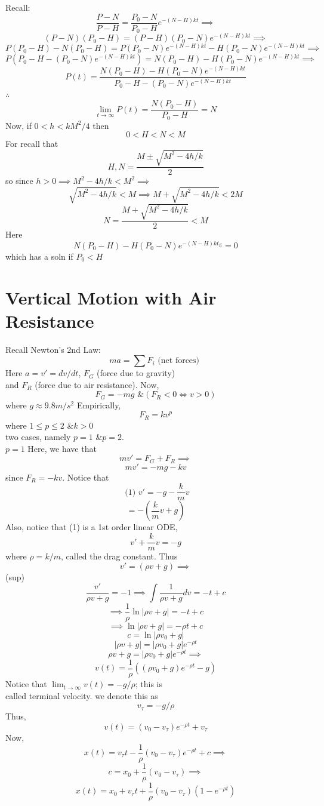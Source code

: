 \documentclass[10pt,a4paper]{article}
\theoremstyle{definition}
\begin{document}
  \newpage
  Recall: 
  \[ \frac{P-N}{P-H} =  \frac{P_0-N}{P_0-H} e^{-(N-H)kt} \implies \]
  \[ (P-N)(P_0-H) = (P-H)(P_0-N)e^{-(N-H)kt} \implies \]
  \[ P(P_0-H)-N(P_0-H) = P(P_0-N)e^{-(N-H)kt} - H(P_0-N)e^{-(N-H)kt}
  \implies \]
  \[ P(P_0-H-(P_0-N)e^{-(N-H)kt} ) = N(P_0-H) -H(P_0-N)e^{-(N-H)kt}
  \implies \]
  \[ \boxed{P(t) = \frac{N(P_0-H) -H(P_0-N)e^{-(N-H)kt}}{P_0-H-(P_0-N)e^{-(N-H)kt} }} \]
  \( \therefore \)
  \[ \lim_{t \to \infty} P(t) = \frac{N(P_0-H)}{P_0-H} = N \]
  Now, if \( 0<h<kM^2/4 \) then
  \[ 0<H<N<M \]
  For recall that
  \[ H,N = \frac{M \pm \sqrt{M^2-4h/k}}{2} \]
  so since \( h>0 \implies M^2-4h/k < M^2 \implies  \)
  \[ \sqrt{M^2-4h/k} < M \implies M + \sqrt{M^2-4h/k} < 2M \]
  \[ N = \frac{M + \sqrt{M^2-4h/k}}{2} < M \]
  Here 
  \[ N(P_0-H) -H(P_0-N)e^{-(N-H)kt_E} = 0 \]
  which has a soln if \( P_0 < H \)


  \newpage
\section*{Vertical Motion with Air Resistance}
  Recall Newton's 2nd Law:
  \[ ma = \sum F_i \text{ (net forces) } \]
  Here \( a = v' = dv/dt \), \( F_G \) (force due to gravity) \\
  and \( F_R \) (force due to air resistance). Now, 
  \[ F_G = -mg \text{ \& } (F_R < 0 \iff v>0) \]
  where \( g \approx 9.8m/s^2 \) Empirically, 
  \[ F_R = kv^p  \]
  where \( 1 \leq p \leq 2 \text{ \& } k>0 \) \\
  two cases, namely \( p=1 \text{ \& } p=2 \). \\[5mm]
  \( p=1 \) Here, we have that 
  \[ mv' = F_G + F_R \implies \]
  \[ mv' = -mg-kv \]
  since \( F_R = -kv \). Notice that 
  \[ \text{ (1) } v' = -g- \frac{k}{m}v \]
  \[ = -( \frac{k}{m}v +g) \]
  Also, notice that (1) is a 1st order linear ODE, 
  \[ v' + \frac{k}{m}v = -g \]
  where \( \rho = k/m \), called the drag constant. Thus 
  \[ v'= (\rho v + g) \implies \]
  (sup)
  \[ \frac{v'}{\rho v + g} = -1 \implies \int \frac{1}{\rho v +g} dv = -t
  +c \]
  \[ \implies \frac{1}{\rho} \ln |\rho v +g | = - t + c \]
  \[ \implies  \ln |\rho v +g | = -\rho t + c \]
  \[ c = \ln | \rho v_0 + g| \]
  \[ |\rho v +g | = | \rho v_0 + g| e^{-\rho t } \]
  \[ \rho v + g = | \rho v_0 + g| e^{-\rho t }  \implies\]
  \[ \boxed{ v(t) = \frac{1}{\rho} ((\rho v_0 + g )e^{-\rho t} -g )} \]
  Notice that \( \lim_{t \to \infty} v(t) = -g/\rho \); this is \\
  called terminal velocity. we denote this as 
  \[ v_{\tau} = -g/\rho \]
  Thus, 
  \[ \boxed{v(t) = (v_0 - v_{\tau}) e^{-\rho t} + v_{\tau}}  \]
  Now, 
  \[ x(t) = v_{\tau} t - \frac{1}{\rho} (v_0 - v_{\tau} ) e^{-\rho t} + c
  \implies\]
  \[ c = x_0 + \frac{1}{\rho} (v_0 - v_{\tau} ) \implies \]
  \[ \boxed{x(t) = x_0 + v_{\tau} t + \frac{1}{\rho} (v_0-v_{\tau}) (1 -
  e^{-\rho t }) } \]
\end{document}
